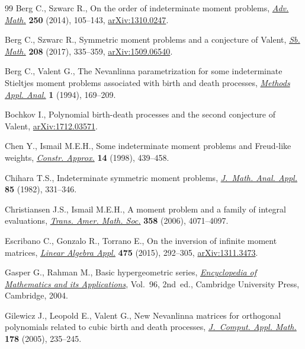 \documentclass[pdftex]{sigma}
\numberwithin{equation}{section}
\begin{document}
\begin{thebibliography}{99}
Berg C., Szwarc R., On the order of indeterminate moment problems, \href{https://doi.org/10.1016/j.aim.2013.09.020}{\textit{Adv.
 Math.}} \textbf{250} (2014), 105--143, \href{https://arxiv.org/abs/1310.0247}{arXiv:1310.0247}.

Berg C., Szwarc R., Symmetric moment problems and a conjecture of {V}alent,
 \href{https://doi.org/10.1070/SM8732}{\textit{Sb. Math.}} \textbf{208} (2017), 335--359, \href{https://arxiv.org/abs/1509.06540}{arXiv:1509.06540}.

Berg C., Valent G., The {N}evanlinna parametrization for some indeterminate
 {S}tieltjes moment problems associated with birth and death processes,
 \href{https://doi.org/10.4310/MAA.1994.v1.n2.a3}{\textit{Methods Appl. Anal.}} \textbf{1} (1994), 169--209.

Bochkov I., Polynomial birth-death processes and the second conjecture of
 {V}alent, \href{https://arxiv.org/abs/1712.03571}{arXiv:1712.03571}.

Chen Y., Ismail M.E.H., Some indeterminate moment problems and {F}reud-like
 weights, \href{https://doi.org/10.1007/s003659900083}{\textit{Constr. Approx.}} \textbf{14} (1998), 439--458.

Chihara T.S., Indeterminate symmetric moment problems, \href{https://doi.org/10.1016/0022-247X(82)90005-1}{\textit{J.~Math. Anal.
 Appl.}} \textbf{85} (1982), 331--346.

Christiansen J.S., Ismail M.E.H., A moment problem and a family of integral
 evaluations, \href{https://doi.org/10.1090/S0002-9947-05-03785-2}{\textit{Trans. Amer. Math. Soc.}} \textbf{358} (2006),
 4071--4097.

Escribano C., Gonzalo R., Torrano E., On the inversion of infinite moment
 matrices, \href{https://doi.org/10.1016/j.laa.2015.02.031}{\textit{Linear Algebra Appl.}} \textbf{475} (2015), 292--305,
 \href{https://arxiv.org/abs/1311.3473}{arXiv:1311.3473}.

Gasper G., Rahman M., Basic hypergeometric series, \href{https://doi.org/10.1017/CBO9780511526251}{\textit{Encyclopedia of
 Mathematics and its Applications}}, Vol.~96, 2nd~ed., Cambridge University
 Press, Cambridge, 2004.

Gilewicz J., Leopold E., Valent G., New {N}evanlinna matrices for orthogonal
 polynomials related to cubic birth and death processes, \href{https://doi.org/10.1016/j.cam.2004.05.025}{\textit{J.~Comput.
 Appl. Math.}} \textbf{178} (2005), 235--245.


\end{thebibliography}
\end{document}
